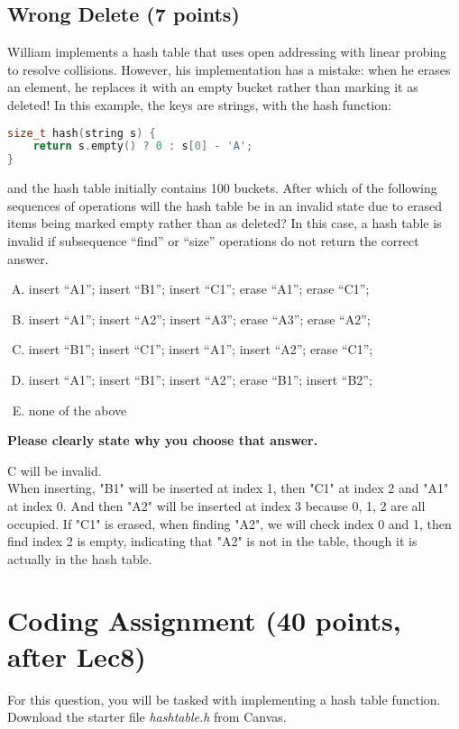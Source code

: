 \documentclass[11pt]{exam}
\begin{document}
\subsection{Wrong Delete (7 points)}
William implements a hash table that uses open addressing with linear probing to resolve collisions. However, his implementation has a mistake: when he erases an element, he replaces it with an empty bucket rather than marking it as deleted! In this example, the keys are strings, with the hash function:
\begin{lstlisting}[language=c++]
size_t hash(string s) {
	return s.empty() ? 0 : s[0] - 'A';
}
\end{lstlisting}

and the hash table initially contains 100 buckets. After which of the following sequences of operations will the hash table be in an invalid state due to erased items being marked empty rather than as deleted? In this case, a hash table is invalid if subsequence “find” or “size” operations do not return the correct answer.
\begin{enumerate}[A.]
\item insert “A1”; insert “B1”; insert “C1”; erase “A1”; erase “C1”;
\item insert “A1”; insert “A2”; insert “A3”; erase “A3”; erase “A2”;
\item insert “B1”; insert “C1”; insert “A1”; insert “A2”; erase “C1”;
\item insert “A1”; insert “B1”; insert “A2”; erase “B1”; insert “B2”;
\item none of the above
\end{enumerate}

\textbf{Please clearly state why you choose that answer.}
\begin{solution}
\par 
C will be invalid. \\
When inserting, "B1" will be inserted at index 1, then "C1" at index 2 and "A1" at index 0. And then "A2" will be inserted at index 3 because 0, 1, 2 are all occupied. If "C1" is erased, when finding "A2", we will check index 0 and 1, then find index 2 is empty, indicating that "A2" is not in the table, though it is actually in the hash table.
\end{solution}

\newpage
\section{Coding Assignment (40 points, after Lec8)}
For this question, you will be tasked with implementing a hash table function. Download the starter file \textit{hashtable.h} from Canvas.
\end{document}
